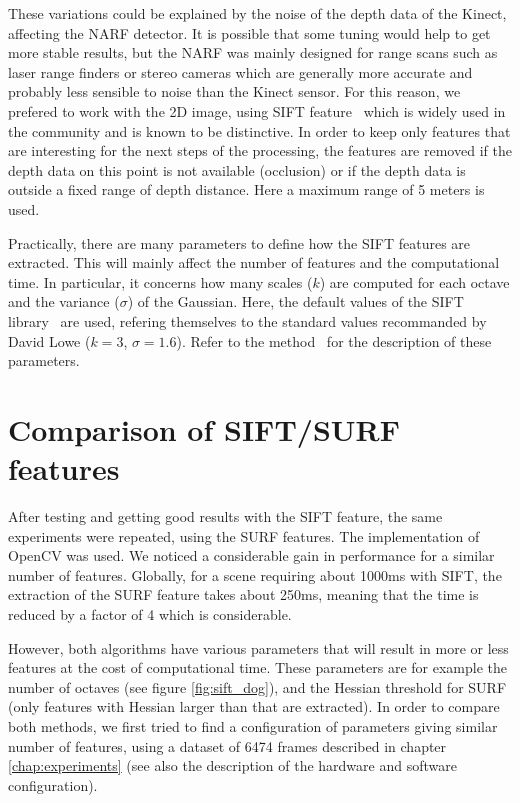 These variations could be explained by the noise of the depth data of the Kinect, affecting the \gls{NARF} detector. It is possible that some tuning would help to get more stable results, but the \gls{NARF} was mainly designed for range scans such as laser range finders or stereo cameras which are generally more accurate and probably less sensible to noise than the Kinect sensor. For this reason, we prefered to work with the 2D image, using \gls{SIFT} feature~\cite{lowe_2004_sift} which is widely used in the community and is known to be distinctive. In order to keep only features that are interesting for the next steps of the processing, the features are removed if the depth data on this point is not available (occlusion) or if the depth data is outside a fixed range of depth distance. Here a maximum range of 5 meters is used.

Practically, there are many parameters to define how the \gls{SIFT} features are extracted. This will mainly affect the number of features and the computational time. In particular, it concerns how many scales ($k$) are computed for each octave and the variance ($\sigma$) of the Gaussian. Here, the default values of the \gls{SIFT} library~\cite{hess_sift} are used, refering themselves to the standard values recommanded by David Lowe ($k=3$, $\sigma=1.6$). Refer to the method~\cite{lowe_2004_sift} for the description of these parameters.

\clearpage
\section{Comparison of SIFT/SURF features}
After testing and getting good results with the \gls{SIFT} feature, the same experiments were repeated, using the \gls{SURF} features. The implementation of OpenCV was used. We noticed a considerable gain in performance for a similar number of features. Globally, for a scene requiring about 1000ms with \gls{SIFT}, the extraction of the \gls{SURF} feature takes about 250ms, meaning that the time is reduced by a factor of 4 which is considerable.

However, both algorithms have various parameters that will result in more or less features at the cost of computational time. These parameters are for example the number of octaves (see figure \ref{fig:sift_dog}), and the Hessian threshold for SURF (only features with Hessian larger than that are extracted). In order to compare both methods, we first tried to find a configuration of parameters giving similar number of features, using a dataset of 6474 frames described in chapter \ref{chap:experiments} (see also the description of the hardware and software configuration).

